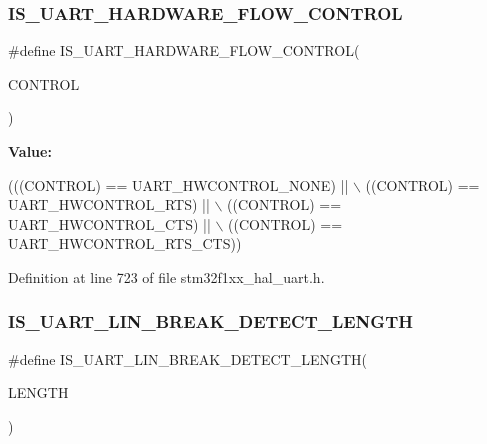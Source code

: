 \subsubsection{\texorpdfstring{I\+S\+\_\+\+U\+A\+R\+T\+\_\+\+H\+A\+R\+D\+W\+A\+R\+E\+\_\+\+F\+L\+O\+W\+\_\+\+C\+O\+N\+T\+R\+OL}{IS\_UART\_HARDWARE\_FLOW\_CONTROL}}
{\footnotesize\ttfamily \#define I\+S\+\_\+\+U\+A\+R\+T\+\_\+\+H\+A\+R\+D\+W\+A\+R\+E\+\_\+\+F\+L\+O\+W\+\_\+\+C\+O\+N\+T\+R\+OL(\begin{DoxyParamCaption}\item[{}]{C\+O\+N\+T\+R\+OL }\end{DoxyParamCaption})}

{\bfseries Value\+:}
\begin{DoxyCode}
(((CONTROL) == UART\_HWCONTROL\_NONE) || \(\backslash\)
                               ((CONTROL) == UART\_HWCONTROL\_RTS) || \(\backslash\)
                               ((CONTROL) == UART\_HWCONTROL\_CTS) || \(\backslash\)
                               ((CONTROL) == UART\_HWCONTROL\_RTS\_CTS))
\end{DoxyCode}


Definition at line 723 of file stm32f1xx\+\_\+hal\+\_\+uart.\+h.

\mbox{\label{group___u_a_r_t___private___macros_ga5f09f62c88629a872d9b6ebf1d068950}} 
\subsubsection{\texorpdfstring{I\+S\+\_\+\+U\+A\+R\+T\+\_\+\+L\+I\+N\+\_\+\+B\+R\+E\+A\+K\+\_\+\+D\+E\+T\+E\+C\+T\+\_\+\+L\+E\+N\+G\+TH}{IS\_UART\_LIN\_BREAK\_DETECT\_LENGTH}}
{\footnotesize\ttfamily \#define I\+S\+\_\+\+U\+A\+R\+T\+\_\+\+L\+I\+N\+\_\+\+B\+R\+E\+A\+K\+\_\+\+D\+E\+T\+E\+C\+T\+\_\+\+L\+E\+N\+G\+TH(\begin{DoxyParamCaption}\item[{}]{L\+E\+N\+G\+TH }\end{DoxyParamCaption})}


